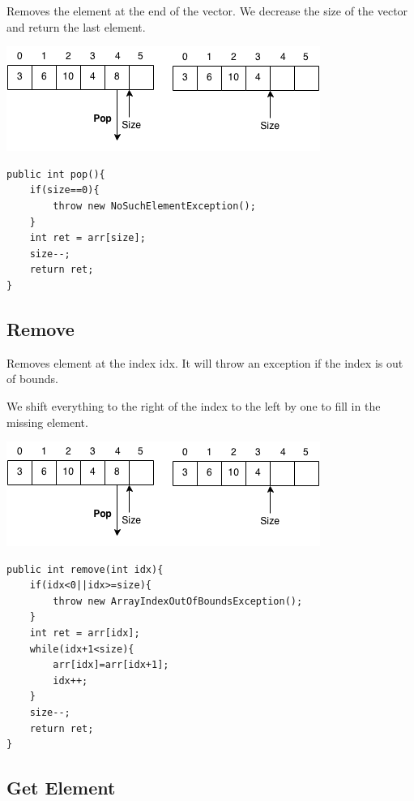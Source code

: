 \documentclass[11pt,oneside]{book}
\makeatletter
\def\maxwidth#1{\ifdim\Gin@nat@width>#1 #1\else\Gin@nat@width\fi}
\makeatother
\begin{document}
Removes the element at the end of the vector. We decrease the size of the vector and return the last element.

\vspace{5px}\includegraphics[width=\maxwidth{\textwidth}]{vector4.png}

\begin{lstlisting}
public int pop(){
    if(size==0){
        throw new NoSuchElementException();
    }
    int ret = arr[size];
    size--;
    return ret;
}
\end{lstlisting}

\subsection{Remove}

Removes element at the index idx. It will throw an exception if the index is out of bounds.

We shift everything to the right of the index to the left by one to fill in the missing element.

\vspace{5px}\includegraphics[width=\maxwidth{\textwidth}]{vector4.png}

\begin{lstlisting}
public int remove(int idx){
    if(idx<0||idx>=size){
        throw new ArrayIndexOutOfBoundsException();
    }
    int ret = arr[idx];
    while(idx+1<size){
        arr[idx]=arr[idx+1];
        idx++;
    }
    size--;
    return ret;
}
\end{lstlisting}

\subsection{Get Element}
\end{document}
